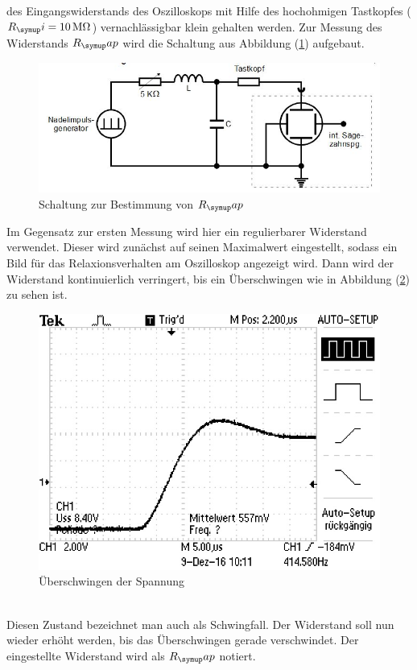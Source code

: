 des Eingangswiderstands des Oszilloskops mit Hilfe des hochohmigen Tastkopfes
($R_\su{i}=10\,\si{\mega\ohm}$) vernachlässigbar klein gehalten werden.
Zur Messung des Widerstands $R_\su{ap}$ wird die Schaltung aus Abbildung
(\ref{fig:rapschlt}) aufgebaut. \\
\begin{figure}[h]
  \centering
  \includegraphics[width=\textwidth]{Bilder/RapSchalt.JPG}
  \caption{Schaltung zur Bestimmung von $R_\su{ap}$}
  \label{fig:rapschlt}
\end{figure}
\newpage
Im Gegensatz zur ersten Messung wird hier ein regulierbarer Widerstand verwendet.
Dieser wird zunächst auf seinen Maximalwert eingestellt, sodass ein Bild
für das Relaxionsverhalten am Oszilloskop angezeigt wird. Dann wird der
Widerstand kontinuierlich verringert, bis ein Überschwingen wie in
Abbildung (\ref{fig:aperid}) zu sehen ist.
\begin{figure}[h]
  \centering
  \includegraphics{Bilder/aperid.JPG}
  \caption{Überschwingen der Spannung}
  \label{fig:aperid}
\end{figure} \\
Diesen Zustand bezeichnet man auch als Schwingfall. Der Widerstand soll nun
wieder erhöht werden, bis das Überschwingen gerade verschwindet. Der eingestellte
Widerstand wird als $R_\su{ap}$ notiert.
